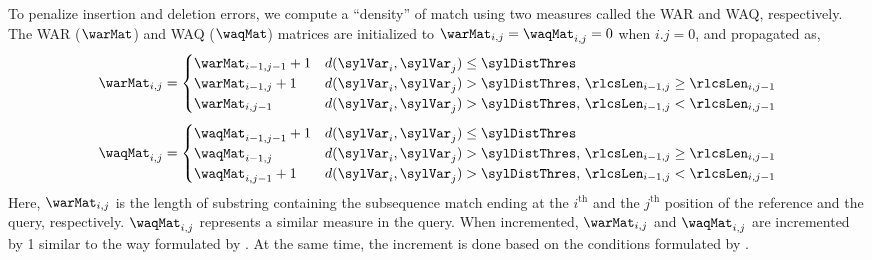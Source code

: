 To penalize insertion and deletion errors, we compute a ``density'' of match using two measures called the \gls{WAR} and \gls{WAQ}, respectively. The \gls{WAR} ($\warMat$) and \gls{WAQ} ($\waqMat$) matrices are initialized to $\warMat_{i,j}=\waqMat_{i,j} = 0$ when $i.j = 0$, and propagated as,
\begin{equation}\label{eq:rlcs:war}
\warMat_{i,j} = 
\begin{cases}
\warMat_{i-1,j-1}+1 & d(\sylVar_i,\sylVar_j) \leq \sylDistThres\\
\warMat_{i-1,j}+1 & d(\sylVar_i,\sylVar_j) > \sylDistThres,\, \rlcsLen_{i-1,j} \geq \rlcsLen_{i,j-1}\\
\warMat_{i,j-1} & d(\sylVar_i,\sylVar_j) > \sylDistThres,\, \rlcsLen_{i-1,j} < \rlcsLen_{i,j-1}
\end{cases}
\end{equation}
%
\begin{equation}\label{eq:rlcs:waq}
\waqMat_{i,j}=
\begin{cases}
\waqMat_{i-1,j-1}+1 & d(\sylVar_i,\sylVar_j) \leq \sylDistThres\\
\waqMat_{i-1,j} & d(\sylVar_i,\sylVar_j) > \sylDistThres,\, \rlcsLen_{i-1,j}\geq \rlcsLen_{i,j-1}\\
\waqMat_{i,j-1}+1 & d(\sylVar_i,\sylVar_j) > \sylDistThres,\, \rlcsLen_{i-1,j} < \rlcsLen_{i,j-1}
\end{cases}
\end{equation}
Here, $\warMat_{i,j}$ is the length of substring containing the subsequence match ending at the $i^\mathrm{th}$ and the $j^\mathrm{th}$ position of the reference and the query, respectively. $\waqMat_{i,j}$ represents a similar measure in the query. When incremented, $\warMat_{i,j}$ and $\waqMat_{i,j}$ are incremented by 1 similar to the way formulated by . At the same time, the increment is done based on the conditions formulated by .

